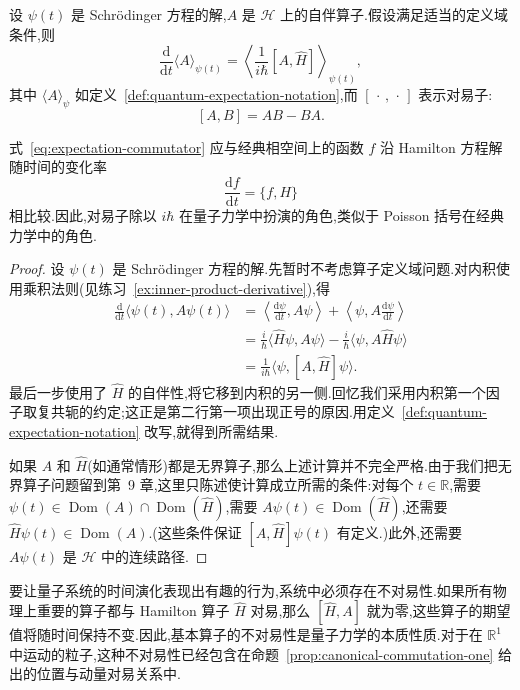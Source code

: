 \begin{proposition}[期望值的演化]\label{prop:expectation-evolution}
设 \(\psi(t)\) 是 Schrödinger 方程的解,\(A\) 是 \(\mathcal{H}\) 上的自伴算子.假设满足适当的定义域条件,则
\begin{equation}
\frac{\mathrm{d}}{\mathrm{d}t}\langle A\rangle_{\psi(t)}
=\left\langle\frac{1}{i\hbar}[A,\widehat H]\right\rangle_{\psi(t)},
\label{eq:expectation-commutator}
\end{equation}
其中 \(\langle A\rangle_{\psi}\) 如定义~\ref{def:quantum-expectation-notation},而 \([\,\cdot\,,\,\cdot\,]\) 表示对易子:
\[
[A,B]=AB-BA.
\]
\end{proposition}

式~\eqref{eq:expectation-commutator} 应与经典相空间上的函数 \(f\) 沿 Hamilton 方程解随时间的变化率
\[
\frac{\mathrm{d}f}{\mathrm{d}t}=\{f,H\}
\]
相比较.因此,对易子除以 \(i\hbar\) 在量子力学中扮演的角色,类似于 Poisson 括号在经典力学中的角色.

\begin{proof}
设 \(\psi(t)\) 是 Schrödinger 方程的解.先暂时不考虑算子定义域问题.对内积使用乘积法则(见练习~\ref{ex:inner-product-derivative}),得
\[
\begin{aligned}
\frac{\mathrm{d}}{\mathrm{d}t}\langle\psi(t),A\psi(t)\rangle
&=\left\langle\frac{\mathrm{d}\psi}{\mathrm{d}t},A\psi\right\rangle
+\left\langle\psi,A\frac{\mathrm{d}\psi}{\mathrm{d}t}\right\rangle\\
&=\frac{i}{\hbar}\langle\widehat H\psi,A\psi\rangle
-\frac{i}{\hbar}\langle\psi,A\widehat H\psi\rangle\\
&=\frac{1}{i\hbar}\langle\psi,[A,\widehat H]\psi\rangle.
\end{aligned}
\]
最后一步使用了 \(\widehat H\) 的自伴性,将它移到内积的另一侧.回忆我们采用内积第一个因子取复共轭的约定;这正是第二行第一项出现正号的原因.用定义~\ref{def:quantum-expectation-notation} 改写,就得到所需结果.

如果 \(A\) 和 \(\widehat H\)(如通常情形)都是无界算子,那么上述计算并不完全严格.由于我们把无界算子问题留到第~9 章,这里只陈述使计算成立所需的条件:对每个 \(t\in\mathbb{R}\),需要 \(\psi(t)\in\operatorname{Dom}(A)\cap\operatorname{Dom}(\widehat H)\),需要 \(A\psi(t)\in\operatorname{Dom}(\widehat H)\),还需要 \(\widehat H\psi(t)\in\operatorname{Dom}(A)\).(这些条件保证 \([A,\widehat H]\psi(t)\) 有定义.)此外,还需要 \(A\psi(t)\) 是 \(\mathcal{H}\) 中的连续路径.
\end{proof}

要让量子系统的时间演化表现出有趣的行为,系统中必须存在不对易性.如果所有物理上重要的算子都与 Hamilton 算子 \(\widehat H\) 对易,那么 \([\widehat H,A]\) 就为零,这些算子的期望值将随时间保持不变.因此,基本算子的不对易性是量子力学的本质性质.对于在 \(\mathbb{R}^{1}\) 中运动的粒子,这种不对易性已经包含在命题~\ref{prop:canonical-commutation-one} 给出的位置与动量对易关系中.


